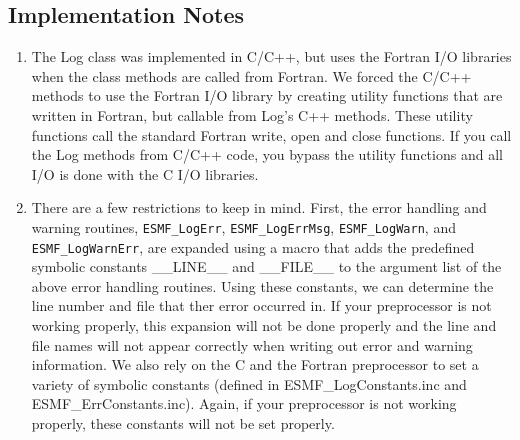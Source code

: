 %

\subsection{Implementation Notes}

\begin{enumerate}

\item The Log class was implemented in C/C++, but uses the Fortran I/O libraries when
the class methods are called from Fortran. We forced the C/C++ methods 
to use the Fortran I/O library by creating 
utility functions that are written in Fortran, but callable from Log's C++ methods.
These utility functions call the standard Fortran write, open and close functions.
If you call the Log methods from C/C++ code, you bypass the utility functions
and all I/O is done with the C I/O libraries.

\item There are a few restrictions to keep in mind.  First, the error handling and
warning routines, {\tt ESMF\_LogErr}, {\tt ESMF\_LogErrMsg}, {\tt ESMF\_LogWarn},
and {\tt ESMF\_LogWarnErr},
are expanded using a macro that adds the
predefined symbolic constants \_\_LINE\_\_ and \_\_FILE\_\_ to the argument list of the above
error handling routines. Using these constants, we can determine the line number and file that ther
error occurred in.  If
your preprocessor is not working properly, this expansion will not be done properly and
the line and file names will not appear correctly when writing out error and warning
information. We also rely on the C and the Fortran preprocessor
to set a variety of symbolic constants (defined in ESMF\_LogConstants.inc and 
ESMF\_ErrConstants.inc).  Again, if your preprocessor is not working properly, these
constants will not be set properly. 

\end{enumerate}



